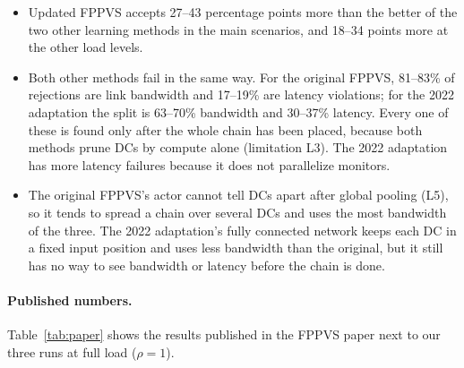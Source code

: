 \begin{itemize}
  \item Updated FPPVS accepts 27--43 percentage points more than the better of
  the two other learning methods in the main scenarios, and 18--34 points more at
  the other load levels.
  \item Both other methods fail in the same way. For the original FPPVS, 81--83\%
  of rejections are link bandwidth and 17--19\% are latency violations; for the
  2022 adaptation the split is 63--70\% bandwidth and 30--37\% latency. Every one
  of these is found only after the whole chain has been placed, because both
  methods prune DCs by compute alone (limitation L3). The 2022 adaptation has more
  latency failures because it does not parallelize monitors.
  \item The original FPPVS's actor cannot tell DCs apart after global pooling
  (L5), so it tends to spread a chain over several DCs and uses the most
  bandwidth of the three. The 2022 adaptation's fully connected network keeps
  each DC in a fixed input position and uses less bandwidth than the original,
  but it still has no way to see bandwidth or latency before the chain is done.
\end{itemize}

\paragraph{Published numbers.} Table~\ref{tab:paper} shows the results published
in the FPPVS paper next to our three runs at full load ($\rho=1$).

\begin{table}[H]
\centering\small
\caption{Published FPPVS results (Tables 6 and 7 of the paper) next to our runs
of the original FPPVS, the 2022 adaptation and updated FPPVS at load 1.0. Values
come from different data and settings; see the text before comparing them.}
\label{tab:paper}

\end{table}

